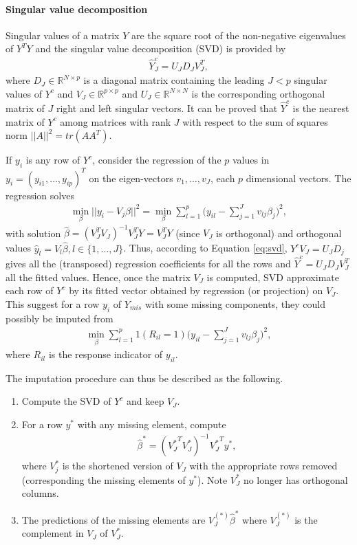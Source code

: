 \paragraph{Singular value decomposition} Singular values of a matrix $Y$ are
the square root of the non-negative eigenvalues of $Y^TY$ and the singular
value decomposition (SVD) is provided by
\begin{align}\label{eq:svd}
\hat Y^c_J = U_JD_JV_J^T,
\end{align}
where $D_J \in \mathbb{R}^{N \times p}$ is a diagonal matrix containing the
leading $J < p$ singular values of $Y^c$ and $V_J \in \mathbb{R}^{p \times p}$
and $U_J \in \mathbb{R}^{N \times N}$ is the corresponding orthogonal matrix of
$J$ right and left singular vectors. It can be proved that $\hat Y^c$ is the
nearest matrix of $Y^c$ among matrices with rank $J$ with respect to the sum of
squares norm $\vert \vert A \vert \vert ^2 = tr(AA^T)$.

If $y_i$ is any row of $Y^c$, consider the regression of the $p$ values in
$y_i=(y_{i1}, \dots, y_{ip})^T$ on the eigen-vectors $v_1, \dots, v_J$, each $p$
dimensional vectors. The regression solves
\begin{align*}%
\min_{\beta} \vert\vert y_{i} - V_j\beta \vert\vert^2 =
  \min_{\beta} \sum_{l=1}^p \big(y_{il} - \sum_{j=1}^J v_{lj}\beta_j \big)^2,
\end{align*}
with solution $\hat \beta = (V_J^T V_J)^{-1} V_J^T Y = V_J^T Y$ (since $V_J$ is
orthogonal) and orthogonal values $\hat y_l = V_l\hat\beta, l \in \{1, \dots, J
\}$. Thus, according to Equation \eqref{eq:svd}, $Y^cV_J = U_JD_j$ gives all
the (transposed) regression coefficients for all the rows and $\hat Y^c =
U_JD_JV_J^T$ all the fitted values. Hence, once the matrix $V_J$ is computed,
SVD approximate each row of $Y^c$ by its fitted vector obtained by regression
(or projection) on $V_J$. This suggest for a row $y_i$ of $Y_{mis}$ with some missing
components, they could possibly be imputed from
\begin{align*}
\min_{\beta} \sum_{l=1}^p 1(R_{il}=1) \big(y_{il} - \sum_{j=1}^J v_{lj}\beta_j \big)^2,
\end{align*}
where $R_{il}$ is the response indicator of $y_{il}$.

The imputation procedure can thus be described as the following.
\begin{enumerate}
\item Compute the SVD of $Y^c$ and keep $V_J$.
\item For a row $y^*$ with any missing element, compute
  \begin{align*}
    \hat\beta^* = ({V_J^{*}}^{T} V_J^*)^{-1} {V_J^*}^{T} y^*,
  \end{align*}
  where $V_j^*$ is the shortened version of $V_J$ with the appropriate rows
  removed (corresponding the missing elements of $y^*$). Note $V_J^{*}$ no
  longer has orthogonal columns.

\item The predictions of the missing elements are $V_J^{(*)}\hat\beta^*$ where
  $V_J^{(*)}$ is the complement in $V_J$ of $V_J^{*}$.
\end{enumerate}

